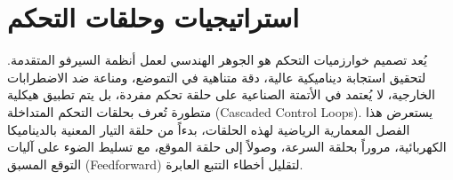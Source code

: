 \chapter{استراتيجيات وحلقات التحكم}
\label{ch:control_strategies}

يُعد تصميم خوارزميات التحكم هو الجوهر الهندسي لعمل أنظمة السيرفو المتقدمة. لتحقيق استجابة ديناميكية عالية، دقة متناهية في التموضع، ومناعة ضد الاضطرابات الخارجية، لا يُعتمد في الأتمتة الصناعية على حلقة تحكم مفردة، بل يتم تطبيق هيكلية متطورة تُعرف بحلقات التحكم المتداخلة (\textenglish{Cascaded Control Loops}). يستعرض هذا الفصل المعمارية الرياضية لهذه الحلقات، بدءاً من حلقة التيار المعنية بالديناميكا الكهربائية، مروراً بحلقة السرعة، وصولاً إلى حلقة الموقع، مع تسليط الضوء على آليات التوقع المسبق (\textenglish{Feedforward}) لتقليل أخطاء التتبع العابرة.

\vspace{0.5cm}


%
